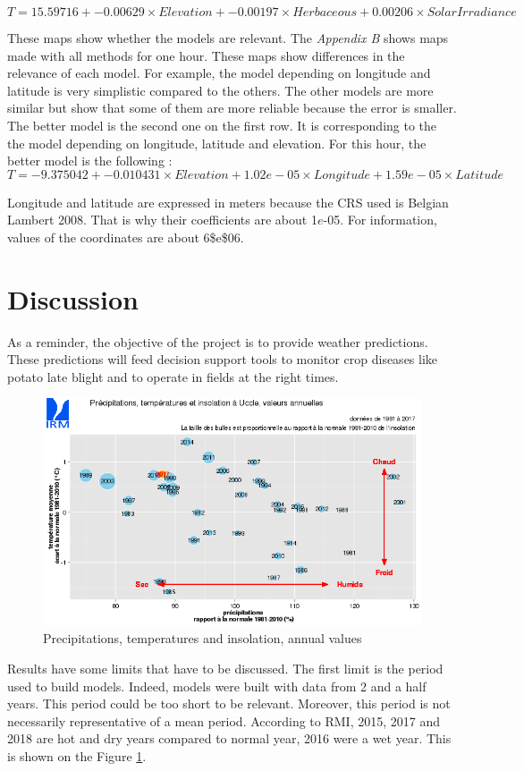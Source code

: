 \documentclass[12pt,twoside]{reedthesis}
\theoremstyle{definition}
\theoremstyle{definition}
\theoremstyle{definition}
\theoremstyle{remark}
\begin{document}
\[
T = 15.59716 + -0.00629 \times Elevation + -0.00197 \times Herbaceous + 0.00206 \times SolarIrradiance
\]

These maps show whether the models are relevant. The \emph{Appendix B}
shows maps made with all methods for one hour. These maps show
differences in the relevance of each model. For example, the model
depending on longitude and latitude is very simplistic compared to the
others. The other models are more similar but show that some of them are
more reliable because the error is smaller. The better model is the
second one on the first row. It is corresponding to the the model
depending on longitude, latitude and elevation. For this hour, the
better model is the following : \[
T = -9.375042 + -0.010431 \times Elevation + 1.02e-05 \times Longitude + 1.59e-05 \times Latitude
\]

Longitude and latitude are expressed in meters because the CRS used is
Belgian Lambert 2008. That is why their coefficients are about
1\(e\)-05. For information, values of the coordinates are about
6\$e\$06.

\section{Discussion}\label{discussion}

As a reminder, the objective of the project is to provide weather
predictions. These predictions will feed decision support tools to
monitor crop diseases like potato late blight and to operate in fields
at the right times.
\begin{figure}

{\centering \includegraphics[width=1\linewidth]{figure/rmi_climate_data} 

}

\caption{Precipitations, temperatures and insolation, annual values}\label{fig:rmi}
\end{figure}
Results have some limits that have to be discussed. The first limit is
the period used to build models. Indeed, models were built with data
from 2 and a half years. This period could be too short to be relevant.
Moreover, this period is not necessarily representative of a mean
period. According to RMI, 2015, 2017 and 2018 are hot and dry years
compared to normal year, 2016 were a wet year. This is shown on the
Figure \ref{fig:rmi}.
\end{document}
